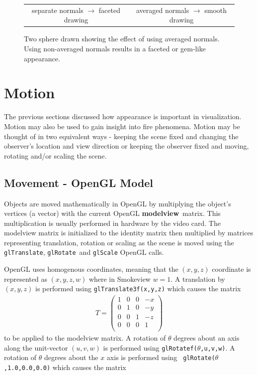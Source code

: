 \documentclass[11pt,twoside]{book}
\begin{document}
\begin{figure}[t]
\begin{center}
\begin{tabular}{cc}
separate normals $\rightarrow$ faceted drawing&averaged normals $\rightarrow$ smooth drawing\\
\end{tabular}
\end{center}
\caption {Two sphere drawn showing the effect of using averaged
normals.  Using non-averaged normals results in a faceted or
gem-like appearance. } \label{fignormals}
\end{figure}

%
%

\chapter{Motion} The previous sections discussed how appearance
is important in visualization.  Motion may also be used to gain insight
into fire phenomena.
Motion may be thought of in two equivalent ways - keeping the
scene fixed and changing the observer's location and view
direction or keeping the observer fixed and moving, rotating
and/or scaling the scene.

\section{Movement - OpenGL Model}
Objects are moved mathematically in OpenGL by multiplying the
object's vertices (a vector) with the current OpenGL {\bf
modelview}\ matrix.  This multiplication is usually performed in
hardware by the video card.  The modelview matrix is initialized
to the identity matrix then multiplied by matrices representing
translation, rotation or scaling as the scene is moved using
the {\tt glTranslate}, {\tt glRotate}\ and {\tt glScale} OpenGL
calls.

OpenGL uses homogenous coordinates, meaning that
the $(x,y,z)$ coordinate is represented as $(x,y,z,w)$ where in
Smokeview $w=1$.  A translation by $(x,y,z)$ is performed using
{\tt glTranslate3f(x,y,z)} which causes the matrix
\begin{eqnarray*}
T=\left(%
\begin{array}{cccc}
  1 & 0 & 0 & -x \\
  0 & 1 & 0 & -y \\
  0 & 0 & 1 & -z \\
  0 & 0 & 0 & 1 \\
\end{array}%
\right)
\end{eqnarray*}
to be applied to the modelview matrix.  A rotation of $\theta$
degrees about an axis along the unit-vector $(u,v,w)$ is performed
using {\tt glRotatef($\theta$,u,v,w)}.  A rotation of $\theta$
degrees about the $x$ axis is performed using {\tt
glRotate($\theta$,1.0,0.0,0.0)} which causes the matrix
\end{document}
